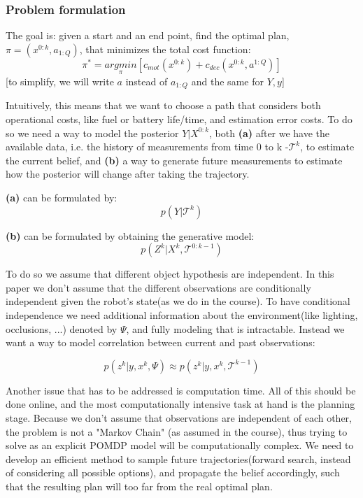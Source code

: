 \documentclass{article}
\begin{document}
	\subsubsection{Problem formulation}
	The goal is:
	given a start and an end point,
	find the optimal plan, $\pi=(x^{0:k},a_{1:Q})$, that minimizes the total cost function:
	\begin{equation}
	\pi^* = \underset{\pi}{argmin}[c_{mot}(x^{0:k}) + c_{dec}(x^{0:k},a^{1:Q})]
	\end{equation}
	[to simplify, we will write $a$ instead of $a_{1:Q}$ and the same for $Y,y$]
	
	Intuitively, this means that we want to choose a path that considers both operational costs, like fuel or battery life/time, and estimation error costs.
	To do so we need a way to model the posterior $Y|X^{0:k}$, both \textbf{(a)} after we have the available data, i.e. the history of measurements from time 0 to k -$\mathcal{T}^k$, to estimate the current belief,
	and \textbf{(b)} a way to generate future measurements to estimate how the posterior will change after taking the trajectory.
	
	\textbf{(a)} can be formulated by:
	\begin{equation}
	p(Y|\mathcal{T}^k)
	\end{equation}
	
	\textbf{(b)} can be formulated by obtaining the generative model:
	\begin{equation}
	p(Z^k|X^k,\mathcal{T}^{0:k-1})
	\end{equation}
	
	To do so we assume that different object hypothesis are independent. In this paper we don't assume that the different observations are conditionally independent given the robot's state(as we do in the course). To have conditional independence we need additional information about the environment(like lighting, occlusions, ...) denoted by $\Psi$, and fully modeling that is intractable. Instead we want a way to model correlation between current and past observations:
	
	\begin{equation}
	p(z^k|y,x^k,\Psi) \approx p(z^k|y,x^k,\mathcal{T}^{k-1})
	\end{equation}
	
	Another issue that has to be addressed is computation time. All of this should be done online, and the most computationally intensive task at hand is the planning stage. Because we don't assume that observations are independent of each other, the problem is not a "Markov Chain" (as assumed in the course), thus trying to solve as an explicit POMDP model will be computationally complex. We need to develop an efficient method to sample future trajectories(forward search, instead of considering all possible options), and propagate the belief accordingly, such that the resulting plan will too far from the real optimal plan.
	
\end{document}
